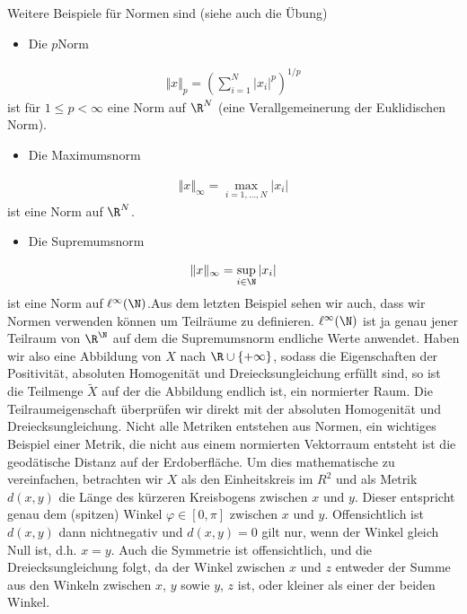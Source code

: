 \documentclass[letterpaper,10pt,english]{jupyterBook}
\begin{document}
Weitere Beispiele für Normen sind (siehe auch die Übung)
\begin{itemize}
\item {} 
Die \(p\)\sphinxhyphen{}Norm

\end{itemize}
\begin{equation*}
\begin{split} \Vert x \Vert_p = \left( \sum_{i=1}^N |x_i|^p \right)^{1/p}\end{split}
\end{equation*}
ist für \(1 \leq p < \infty\) eine Norm auf \(\R^N\) (eine Verallgemeinerung der Euklidischen Norm).
\begin{itemize}
\item {} 
Die Maximumsnorm

\end{itemize}
\begin{equation*}
\begin{split} \Vert x \Vert_\infty = \max_{i=1,\ldots,N} |x_i|\end{split}
\end{equation*}
ist eine Norm auf \(\R^N\).
\begin{itemize}
\item {} 
Die Supremumsnorm

\end{itemize}
\begin{equation*}
\begin{split} \Vert x \Vert_\infty = \sup_{i \in \N} |x_i|\end{split}
\end{equation*}
ist eine Norm auf \(\ell^\infty(\N)\).Aus dem letzten Beispiel sehen wir auch, dass wir Normen verwenden können um Teilräume zu definieren. \(\ell^\infty(\N)\) ist ja genau jener Teilraum von \(\R^\N\) auf dem die Supremumsnorm endliche Werte anwendet. Haben wir also eine Abbildung von \(X  \) nach \(\R \cup \{+ \infty\}\), sodass die Eigenschaften der Positivität, absoluten Homogenität und Dreiecksungleichung erfüllt sind, so ist die Teilmenge \(\tilde X\) auf der die Abbildung endlich ist, ein normierter Raum. Die Teilraumeigenschaft überprüfen wir direkt mit der absoluten Homogenität und Dreiecksungleichung.
Nicht alle Metriken entstehen aus Normen, ein wichtiges Beispiel einer Metrik, die nicht aus einem normierten Vektorraum entsteht ist die geodätische Distanz auf der Erdoberfläche. Um dies mathematische zu vereinfachen, betrachten wir \(X\) als den Einheitskreis im \(R^2\) und als Metrik \(d(x,y)\) die Länge des kürzeren Kreisbogens zwischen \(x\) und \(y\). Dieser entspricht genau dem (spitzen) Winkel \(\varphi \in [0,\pi]\) zwischen \(x\) und \(y\). Offensichtlich ist \(d(x,y)\) dann nichtnegativ und \(d(x,y)=0\) gilt nur, wenn der Winkel gleich Null ist, d.h. \(x =y\). Auch die Symmetrie ist offensichtlich, und die Dreiecksungleichung folgt, da der Winkel zwischen \(x\) und \(z\) entweder der Summe aus den Winkeln zwischen \(x\), \(y\) sowie \(y\), \(z\) ist, oder kleiner als einer der beiden Winkel.
\end{document}
